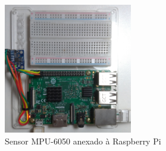 \begin{figure}[H]
    \centering
    \caption{Sensor MPU-6050 anexado à Raspberry Pi}\label{fig:mpu6050-proto-top}
    \includegraphics[width=0.5\textwidth]{figuras/mpu6050-proto-top.jpg}
\end{figure}
